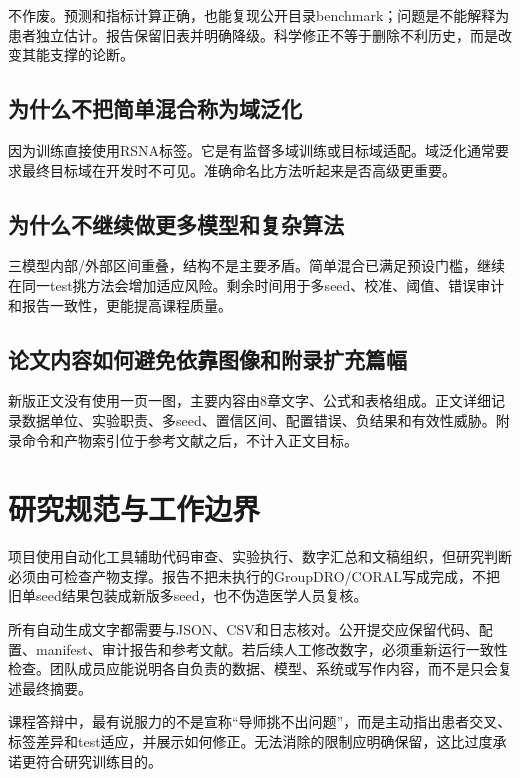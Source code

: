 不作废。预测和指标计算正确，也能复现公开目录benchmark；问题是不能解释为患者独立估计。报告保留旧表并明确降级。科学修正不等于删除不利历史，而是改变其能支撑的论断。

\subsection{为什么不把简单混合称为域泛化}

因为训练直接使用RSNA标签。它是有监督多域训练或目标域适配。域泛化通常要求最终目标域在开发时不可见。准确命名比方法听起来是否高级更重要。

\subsection{为什么不继续做更多模型和复杂算法}

三模型内部/外部区间重叠，结构不是主要矛盾。简单混合已满足预设门槛，继续在同一test挑方法会增加适应风险。剩余时间用于多seed、校准、阈值、错误审计和报告一致性，更能提高课程质量。

\subsection{论文内容如何避免依靠图像和附录扩充篇幅}

新版正文没有使用一页一图，主要内容由8章文字、公式和表格组成。正文详细记录数据单位、实验职责、多seed、置信区间、配置错误、负结果和有效性威胁。附录命令和产物索引位于参考文献之后，不计入正文目标。

\section{研究规范与工作边界}

项目使用自动化工具辅助代码审查、实验执行、数字汇总和文稿组织，但研究判断必须由可检查产物支撑。报告不把未执行的GroupDRO/CORAL写成完成，不把旧单seed结果包装成新版多seed，也不伪造医学人员复核。

所有自动生成文字都需要与JSON、CSV和日志核对。公开提交应保留代码、配置、manifest、审计报告和参考文献。若后续人工修改数字，必须重新运行一致性检查。团队成员应能说明各自负责的数据、模型、系统或写作内容，而不是只会复述最终摘要。

课程答辩中，最有说服力的不是宣称“导师挑不出问题”，而是主动指出患者交叉、标签差异和test适应，并展示如何修正。无法消除的限制应明确保留，这比过度承诺更符合研究训练目的。
